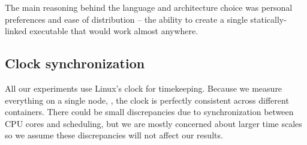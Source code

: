 The main reasoning behind the language and architecture choice was personal preferences and ease of distribution -- the ability to create a single statically-linked executable that would work almost anywhere.

\subsection{Clock synchronization}

All our experiments use Linux's  clock for timekeeping. Because we measure everything on a single node, , the clock is perfectly consistent across different containers. There could be small discrepancies due to synchronization between CPU cores and scheduling, but we are mostly concerned about larger time scales so we assume these discrepancies will not affect our results.

